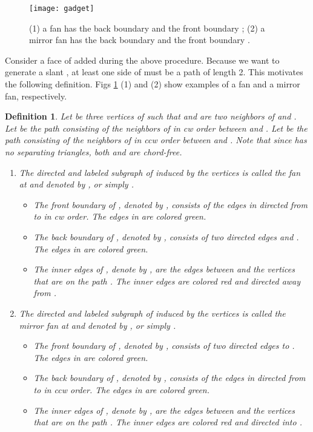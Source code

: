 \documentclass[11pt]{article}
\newtheorem{definition}[figure]{Definition}
\begin{document}
\begin{figure}[t]
\begin{center}
\texttt{[image: gadget]}
\centering
\caption{(1)  a fan  has the back boundary  and the front boundary ;
(2)  a mirror fan  has the back boundary  and the front boundary .}
\label{fig:gadget}
\end{center}
\end{figure}

Consider a face  of  added during the above procedure.
Because we want to generate a slant  , at least one side of
 must be a path of length 2. This motivates the following definition.
Figs \ref{fig:gadget} (1) and (2)
show examples of a fan and a mirror fan, respectively.

\begin{definition}\label{def:gadget}
Let  be three vertices of  such that
 and  are two neighbors of  and .
Let  be the path consisting of the neighbors 
of  in cw order between  and .
Let  be the path consisting of the neighbors 
of  in ccw order between  and . Note that since  has no
separating triangles, both  and  are chord-free.
\begin{enumerate}

\item The directed and labeled subgraph
of  induced by the vertices 
is called the {\em fan at} 
and denoted by , or simply .

\begin{itemize}
\item The \emph{front boundary} of , denoted by ,
consists of the edges in  directed from  to  in cw order.
The edges in  are colored green.

\item The \emph{back boundary} of , denoted by ,
consists of two directed edges  and .
The edges in  are colored green.

\item The \emph{inner edges} of , denote by , are the edges
between  and the vertices  that are on the path
. The inner edges are colored red and directed away from .
\end{itemize}

\item The directed and labeled
subgraph of  induced by the vertices 
is called the {\em mirror fan at} 
and denoted by , or simply .

\begin{itemize}
\item The \emph{front boundary} of , denoted by ,
consists of two directed edges  to .
The edges in  are colored green.

\item The \emph{back boundary} of , denoted by , consists
of the edges in  directed from  to  in ccw order.
The edges in  are colored green.

\item The \emph{inner edges} of , denote by , are the edges
between  and the vertices  that are on the path
. The inner edges are colored red and directed into .
\end{itemize}
\end{enumerate}
\end{definition}
\end{document}
